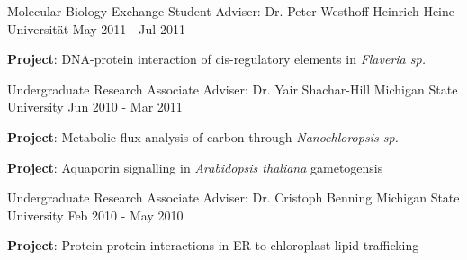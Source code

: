\begin{cventries}
  \cventry
    {Molecular Biology Exchange Student} %
    {Adviser: Dr. Peter Westhoff} %
    {Heinrich-Heine Universit{\"a}t} %
    {May 2011 - Jul 2011} %
    {
      \begin{cvitems} %
        \item {\textbf{Project}: DNA-protein interaction of cis-regulatory elements in {\it Flaveria sp.}}
      \end{cvitems}
    }
    
  \cventry
    {Undergraduate Research Associate} %
    {Adviser: Dr. Yair Shachar-Hill} %
    {Michigan State University} %
    {Jun 2010 - Mar 2011} %
    {
      \begin{cvitems} %
        \item {\textbf{Project}: Metabolic flux analysis of carbon through {\it Nanochloropsis sp.}}
        \item {\textbf{Project}: Aquaporin signalling in {\it Arabidopsis thaliana} gametogensis}
      \end{cvitems}
    }

  \cventry
    {Undergraduate Research Associate} %
    {Adviser: Dr. Cristoph Benning} %
    {Michigan State University} %
    {Feb 2010 - May 2010} %
    {
      \begin{cvitems} %
        \item {\textbf{Project}: Protein-protein interactions in ER to chloroplast lipid trafficking}
      \end{cvitems}
    }
    
\vspace{-4.0mm}
\end{cventries}
